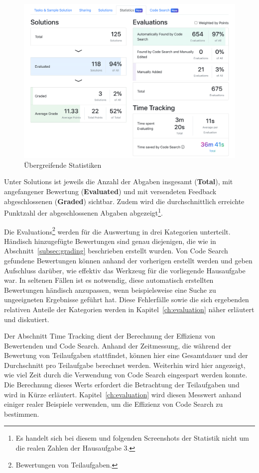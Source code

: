 \begin{figure}
    \centering
    \includegraphics[width=\textwidth]{images/assignment-statistics-basics}
    \caption{Übergreifende Statistiken}
    \label{fig:assignment-statistics-basics}
\end{figure}

Unter Solutions ist jeweils die Anzahl der Abgaben insgesamt (\textbf{Total}), mit angefangener Bewertung (\textbf{Evaluated}) und mit versendeten Feedback abgeschlossenen (\textbf{Graded}) sichtbar.
Zudem wird die durchschnittlich erreichte Punktzahl der abgeschlossenen Abgaben abgezeigt\footnote{
    Es handelt sich bei diesem und folgenden Screenshots der Statistik nicht um die realen Zahlen der Hausaufgabe 3.
}.

Die Evaluations\footnote{
    Bewertungen von Teilaufgaben.
} werden für die Auswertung in drei Kategorien unterteilt.
Händisch hinzugefügte Bewertungen sind genau diejenigen, die wie in Abschnitt~\ref{subsec:grading} beschrieben erstellt wurden.
Von Code Search gefundene Bewertungen können anhand der vorherigen erstellt werden und geben Aufschluss darüber, wie effektiv das Werkzeug für die vorliegende Hausaufgabe war.
In seltenen Fällen ist es notwendig, diese automatisch erstellten Bewertungen händisch anzupassen, wenn beispielsweise eine Suche zu ungeeigneten Ergebnisse geführt hat.
Diese Fehlerfälle sowie die sich ergebenden relativen Anteile der Kategorien werden in Kapitel~\ref{ch:evaluation} näher erläutert und diskutiert.

Der Abschnitt Time Tracking dient der Berechnung der Effizienz von Bewertenden und Code Search.
Anhand der Zeitmessung, die während der Bewertung von Teilaufgaben stattfindet, können hier eine Gesamtdauer und der Durchschnitt pro Teilaufgabe berechnet werden.
Weiterhin wird hier angezeigt, wie viel Zeit durch die Verwendung von Code Search eingespart werden konnte.
Die Berechnung dieses Werts erfordert die Betrachtung der Teilaufgaben und wird in Kürze erläutert.
Kapitel~\ref{ch:evaluation} wird diesen Messwert anhand einiger realer Beispiele verwenden, um die Effizienz von Code Search zu bestimmen.

